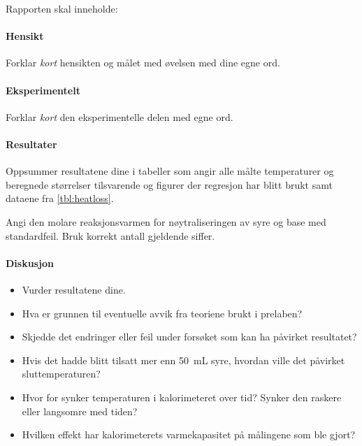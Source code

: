 	Rapporten skal inneholde:
	
	\paragraph{Hensikt}
	Forklar \emph{kort} hensikten og målet med øvelsen med dine egne ord.
	
	\paragraph{Eksperimentelt}
	Forklar \emph{kort} den eksperimentelle delen med egne ord.
	
	\paragraph{Resultater}
	Oppsummer resultatene dine i tabeller som angir alle målte temperaturer og beregnede størrelser tilsvarende  og figurer der regresjon har blitt brukt samt dataene fra \cref{tbl:heatloss}.
	
	Angi den molare reaksjonsvarmen for nøytraliseringen av syre og base med standardfeil. Bruk korrekt antall gjeldende siffer.
	
	\paragraph{Diskusjon}
	\begin{itemize}
		\item Vurder resultatene dine.
		\item Hva er grunnen til eventuelle avvik fra teoriene brukt i prelaben?
		\item Skjedde det endringer eller feil under forsøket som kan ha påvirket resultatet?
		\item Hvis det hadde blitt tilsatt mer enn \SI{50}{\milli\liter} syre, hvordan ville det påvirket sluttemperaturen?
		\item Hvor for synker temperaturen i kalorimeteret over tid? Synker den raskere eller langsomre med tiden?
		\item Hvilken effekt har kalorimeterets varmekapasitet på målingene som ble gjort?
	\end{itemize}
	
